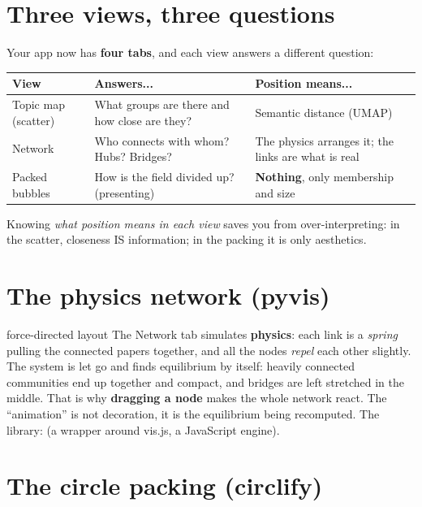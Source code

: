 \documentclass[11pt,a4paper]{article}
\begin{document}

\section{Three views, three questions}

Your app now has \textbf{four tabs}, and each view answers a different question:

\begin{center}
\begin{tabular}{lp{5.2cm}p{4.6cm}}
\textbf{View} & \textbf{Answers...} & \textbf{Position means...} \\
\hline
Topic map (scatter) & What groups are there and how close are they? & Semantic distance (UMAP) \\
Network & Who connects with whom? Hubs? Bridges? & The physics arranges it; the links are what is real \\
Packed bubbles & How is the field divided up? (presenting) & \textbf{Nothing}, only membership and size \\
\end{tabular}
\end{center}

Knowing \emph{what position means in each view} saves you from over-interpreting: in the
scatter, closeness IS information; in the packing it is only aesthetics.

\section{The physics network (pyvis)}

\begin{concepto}{force-directed layout}
The Network tab simulates \textbf{physics}: each link is a \emph{spring} pulling the connected
papers together, and all the nodes \emph{repel} each other slightly. The system is let go and
finds equilibrium by itself: heavily connected communities end up together and compact, and
bridges are left stretched in the middle. That is why \textbf{dragging a node} makes the whole
network react. The ``animation'' is not decoration, it is the equilibrium being recomputed.
The library:  (a wrapper around vis.js, a JavaScript engine).
\end{concepto}

\section{The circle packing (circlify)}
\end{document}
